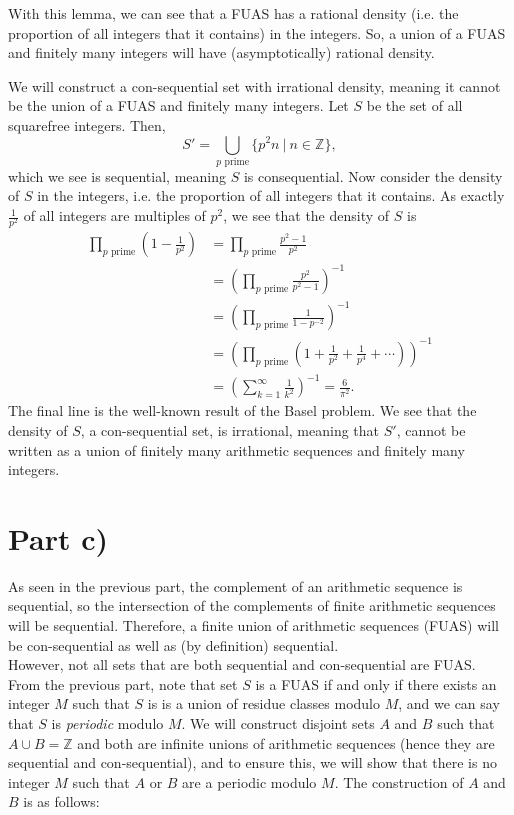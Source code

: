 \documentclass{article}
\begin{document}
    With this lemma, we can see that a FUAS has a rational density (i.e. the proportion of all integers that it contains) in the integers. So, a union of a FUAS and finitely many integers will have (asymptotically) rational density.
    
    We will construct a con-sequential set with irrational density, meaning it cannot be the union of a FUAS and finitely many integers. Let $S$ be the set of all squarefree integers. Then, $$S' = \bigcup_{p \text{ prime}} \{p^2n\ |\ n\in \mathbb{Z}\},$$
    which we see is sequential, meaning $S$ is consequential. Now consider the density of $S$ in the integers, i.e. the proportion of all integers that it contains. As exactly $\frac{1}{p^2}$ of all integers are multiples of $p^2$, we see that the density of $S$ is
    \begin{align*}
    \prod_{p\text{ prime}} \left(1 - \frac{1}{p^2}\right) &= \prod_{p\text{ prime}} \frac{p^2 - 1}{p^2} \\
    &= \left({\prod_{p\text{ prime}}\frac{p^2}{p^2 - 1}}\right)^{-1} \\
    &= \left({\prod_{p\text{ prime}} \frac{1}{1 - p^{-2}}}\right)^{-1} \\
    &= \left(\prod_{p\text{ prime}} \left(1 + \frac{1}{p^2} + \frac{1}{p^4} + \cdots\right)\right)^{-1} \\
    &= \left(\sum_{k = 1}^\infty \frac{1}{k^2}\right)^{-1} = \frac{6}{\pi^2}.
    \end{align*}
    The final line is the well-known result of the Basel problem. We see that the density of $S$, a con-sequential set, is irrational, meaning that $S'$, cannot be written as a union of finitely many arithmetic sequences and finitely many integers.
    
    \section*{Part c)}

    As seen in the previous part, the complement of an arithmetic sequence is sequential, so the intersection of the complements of finite arithmetic sequences will be sequential. Therefore, a finite union of arithmetic sequences (FUAS) will be con-sequential as well as (by definition) sequential. \\

    However, not all sets that are both sequential and con-sequential are FUAS. From the previous part, note that set $S$ is a FUAS if and only if there exists an integer $M$ such that $S$ is is a union of residue classes modulo $M$, and we can say that $S$ is \textit{periodic} modulo $M$. We will construct disjoint sets $A$ and $B$ such that $A\cup B = \mathbb{Z}$ and both are infinite unions of arithmetic sequences (hence they are sequential and con-sequential), and to ensure this, we will show that there is no integer $M$ such that $A$ or $B$ are a periodic modulo $M$. The construction of $A$ and $B$ is as follows: \\
\end{document}
